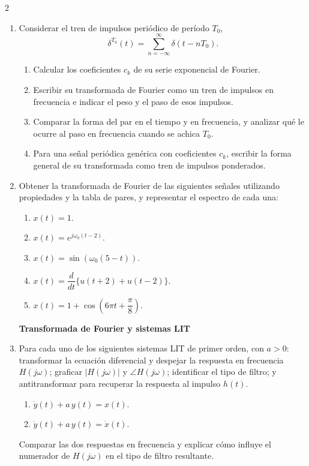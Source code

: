 \documentclass[10pt,a4paper]{article}
\begin{document}
\begin{multicols}{2}
\begin{enumerate}
			\item Considerar el tren de impulsos periódico de período $T_0$,
			\[
				\delta^{T_0}(t) = \sum_{n=-\infty}^{\infty} \delta(t - nT_0).
			\]
			\begin{enumerate}
				\item Calcular los coeficientes $c_k$ de su serie exponencial de Fourier.
				\item Escribir su transformada de Fourier como un tren de impulsos en frecuencia e indicar el peso y el paso de esos impulsos.
				\item Comparar la forma del par en el tiempo y en frecuencia, y analizar qué le ocurre al paso en frecuencia cuando se achica $T_0$.
				\item Para una señal periódica genérica con coeficientes $c_k$, escribir la forma general de su transformada como tren de impulsos ponderados.
			\end{enumerate}

			\item Obtener la transformada de Fourier de las siguientes señales utilizando propiedades y la tabla de pares, y representar el espectro de cada una:
			\begin{enumerate}
				\item $x(t) = 1$.
				\item $x(t) = e^{j\omega_0(t-2)}$.
				\item $x(t) = \sin(\omega_0(5-t))$.
				\item $x(t) = \dfrac{d}{dt}\{u(t+2) + u(t-2)\}$.
				\item $x(t) = 1 + \cos\!\left(6\pi t + \dfrac{\pi}{8}\right)$.
			\end{enumerate}

			\textbf{Transformada de Fourier y sistemas LIT}
			\item Para cada uno de los siguientes sistemas LIT de primer orden, con $a>0$: transformar la ecuación diferencial y despejar la respuesta en frecuencia $H(j\omega)$; graficar $|H(j\omega)|$ y $\angle H(j\omega)$; identificar el tipo de filtro; y antitransformar para recuperar la respuesta al impulso $h(t)$.
			\begin{enumerate}
				\item $\dot{y}(t) + a\,y(t) = x(t)$.
				\item $\dot{y}(t) + a\,y(t) = \dot{x}(t)$.
			\end{enumerate}
			Comparar las dos respuestas en frecuencia y explicar cómo influye el numerador de $H(j\omega)$ en el tipo de filtro resultante.


\end{enumerate}
\end{multicols}
\end{document}
